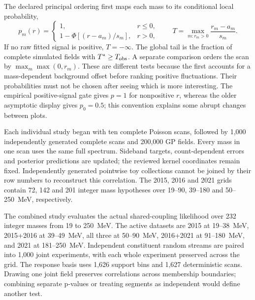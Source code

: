 The declared principal ordering first maps each mass to its conditional
local probability,
\begin{equation}
 p_m(r)=\begin{cases}
 1,&r\leq0,\\
 1-\Phi[(r-a_m)/s_m],&r>0,
 \end{cases}\qquad
 T=\max_{m:r_m>0}\frac{r_m-a_m}{s_m}.
 \label{v5-eq:global-ordering}
\end{equation}
If no raw fitted signal is positive, $T=-\infty$. The global tail is the
fraction of complete simulated fields with $T^*\geq T_{\rm obs}$.
A separate comparison orders the scan by $\max_m\max(0,r_m)$.
These are different tests because the first accounts for a mass-dependent
background offset before ranking positive fluctuations. Their probabilities
must not be chosen after seeing which is more interesting. The empirical
positive-signal gate gives $p=1$ for nonpositive $r$, whereas the older
asymptotic display gives $p_0=0.5$; this convention explains some abrupt
changes between plots.

Each individual study began with ten complete Poisson scans, followed by
1,000 independently generated complete scans and 200,000 GP fields.
Every mass in one scan uses the same full spectrum. Sideband targets,
count-dependent errors and posterior predictions are updated; the reviewed
kernel coordinates remain fixed. Independently generated pointwise toy
collections cannot be joined by their row numbers to reconstruct this
correlation. The 2015, 2016 and 2021 grids contain 72, 142 and 201 integer
mass hypotheses over 19--90, 39--180 and 50--250~MeV, respectively.

The combined study evaluates the actual shared-coupling likelihood over
232 integer masses from 19 to 250~MeV. The active datasets are 2015 at
19--38~MeV, 2015+2016 at 39--49~MeV, all three at 50--90~MeV,
2016+2021 at 91--180~MeV, and 2021 at 181--250~MeV. Independent
constituent random streams are paired into 1,000 joint experiments, with
each whole experiment preserved across the grid. The response basis uses
1,626 support bins and 1,627 deterministic scans. Drawing one joint field
preserves correlations across membership boundaries; combining separate
p-values or treating segments as independent would define another test.

